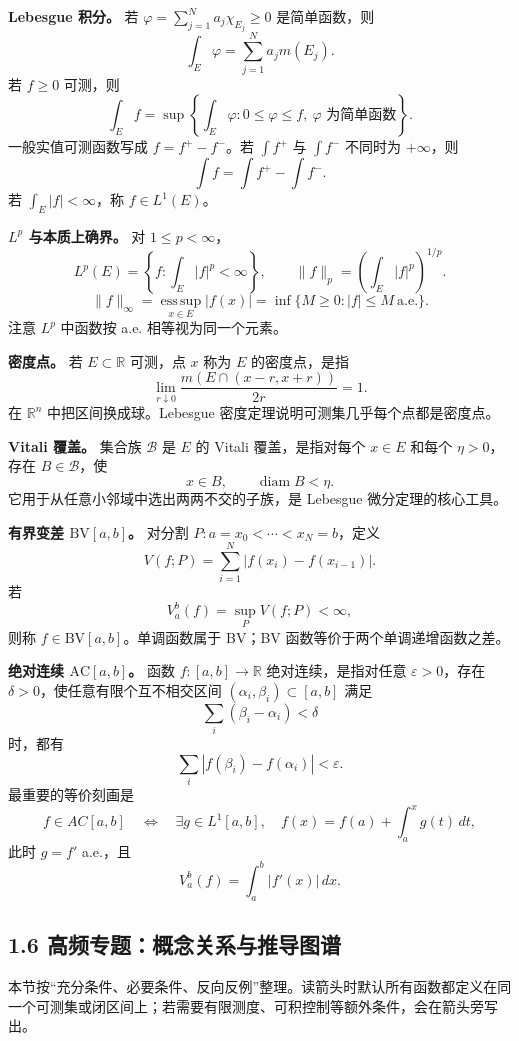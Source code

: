 \documentclass[
UTF8]{ctexart}
\newcommand{\impA}{\hspace{0.4em}{\small\textcolor{impAColor}{\textbf{[A 核心]}}}}
\newcommand{\impB}{\hspace{0.4em}{\small\textcolor{impBColor}{\textbf{[B 重要]}}}}
\begin{document}
\textbf{Lebesgue 积分。}\impA
若 \(\varphi=\sum_{j=1}^N a_j\chi_{E_j}\ge0\) 是简单函数，则
\[
  \int_E\varphi=\sum_{j=1}^N a_jm(E_j).
\]
若 \(f\ge0\) 可测，则
\[
  \int_E f=\sup\left\{\int_E\varphi:
  0\le\varphi\le f,\ \varphi\text{ 为简单函数}\right\}.
\]
一般实值可测函数写成 \(f=f^+-f^-\)。若 \(\int f^+\) 与 \(\int f^-\)
不同时为 \(+\infty\)，则
\[
  \int f=\int f^+-\int f^-.
\]
若 \(\int_E|f|<\infty\)，称 \(f\in L^1(E)\)。

\textbf{\(L^p\) 与本质上确界。}\impA
对 \(1\le p<\infty\)，
\[
  L^p(E)=\left\{f:\int_E|f|^p<\infty\right\},\qquad
  \|f\|_p=\left(\int_E|f|^p\right)^{1/p}.
\]
\[
  \|f\|_\infty=\operatorname*{ess\,sup}_{x\in E}|f(x)|
  =\inf\{M\ge0:|f|\le M\ \text{a.e.}\}.
\]
注意 \(L^p\) 中函数按 a.e. 相等视为同一个元素。

\textbf{密度点。}\impB
若 \(E\subset\mathbb R\) 可测，点 \(x\) 称为 \(E\) 的密度点，是指
\[
  \lim_{r\downarrow0}\frac{m(E\cap(x-r,x+r))}{2r}=1.
\]
在 \(\mathbb R^n\) 中把区间换成球。Lebesgue 密度定理说明可测集几乎每个点都是密度点。

\textbf{Vitali 覆盖。}\impB
集合族 \(\mathcal B\) 是 \(E\) 的 Vitali 覆盖，是指对每个 \(x\in E\) 和每个
\(\eta>0\)，存在 \(B\in\mathcal B\)，使
\[
  x\in B,\qquad \operatorname{diam}B<\eta.
\]
它用于从任意小邻域中选出两两不交的子族，是 Lebesgue 微分定理的核心工具。

\textbf{有界变差 \(\mathrm{BV}[a,b]\)。}\impA
对分割 \(P:a=x_0<\cdots<x_N=b\)，定义
\[
  V(f;P)=\sum_{i=1}^N|f(x_i)-f(x_{i-1})|.
\]
若
\[
  V_a^b(f)=\sup_P V(f;P)<\infty,
\]
则称 \(f\in\mathrm{BV}[a,b]\)。单调函数属于 BV；BV 函数等价于两个单调递增函数之差。

\textbf{绝对连续 \(\mathrm{AC}[a,b]\)。}\impA
函数 \(f:[a,b]\to\mathbb R\) 绝对连续，是指对任意 \(\varepsilon>0\)，存在
\(\delta>0\)，使任意有限个互不相交区间 \((\alpha_i,\beta_i)\subset[a,b]\)
满足
\[
  \sum_i(\beta_i-\alpha_i)<\delta
\]
时，都有
\[
  \sum_i|f(\beta_i)-f(\alpha_i)|<\varepsilon.
\]
最重要的等价刻画是
\[
  f\in AC[a,b]
  \quad\Longleftrightarrow\quad
  \exists g\in L^1[a,b],\quad f(x)=f(a)+\int_a^x g(t)\,dt,
\]
此时 \(g=f'\) a.e.，且
\[
  V_a^b(f)=\int_a^b|f'(x)|\,dx.
\]

\subsection{1.6 高频专题：概念关系与推导图谱}\label{ux9ad8ux9891ux4e13ux9898ux6982ux5ff5ux5173ux7cfbux4e0eux63a8ux5bfcux56feux8c31}

本节按“充分条件、必要条件、反向反例”整理。读箭头时默认所有函数都定义在同一个可测集或闭区间上；若需要有限测度、可积控制等额外条件，会在箭头旁写出。
\end{document}
